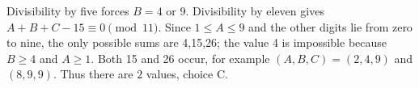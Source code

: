 Divisibility by five forces $B=4$ or 9. Divisibility by eleven gives $A+B+C-15\equiv0\pmod{11}$. Since $1\le A\le9$ and the other digits lie from zero to nine, the only possible sums are 4,15,26; the value 4 is impossible because $B\ge4$ and $A\ge1$. Both 15 and 26 occur, for example $(A,B,C)=(2,4,9)$ and $(8,9,9)$. Thus there are $\boxed{2}$ values, choice C.
